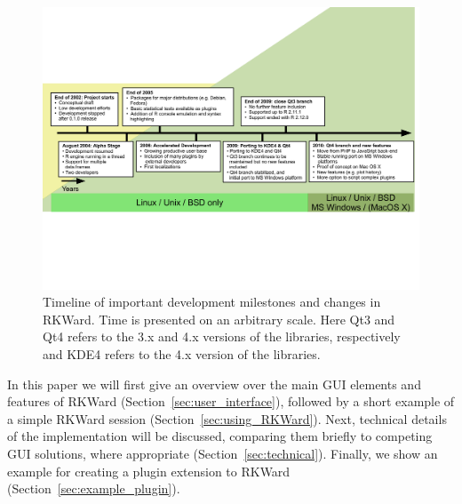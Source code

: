 \begin{figure}[t!]
 \centering
 \includegraphics[clip=true,trim=0cm 5.7cm 0cm 5.7cm,width=16cm]{../figures/timeline.pdf}
 \caption{Timeline of important development milestones and changes in RKWard.
          Time is presented on an arbitrary scale. Here Qt3 and Qt4 refers to the 3.x and
          4.x versions of the  libraries, respectively and KDE4 refers to the
          4.x version of the  libraries.}
 \label{fig:timeline}
\end{figure}

In this paper we will first give an overview over the main GUI elements and
features of RKWard (Section~\ref{sec:user_interface}), followed by a short example 
of a simple RKWard session (Section~\ref{sec:using_RKWard}). Next, technical 
details of the implementation will be discussed, comparing them briefly to 
competing GUI solutions, where appropriate (Section~\ref{sec:technical}).
Finally, we show an example for creating a plugin extension to RKWard 
(Section~\ref{sec:example_plugin}).
